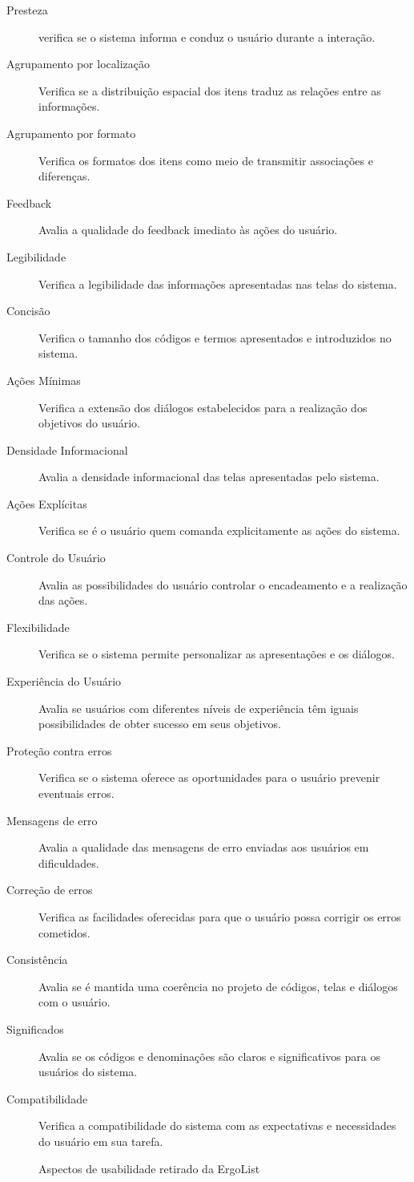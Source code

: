 \begin{description}
\item[Presteza]
verifica se o sistema informa e conduz o usuário durante a interação.
\item[Agrupamento por localização]
Verifica se a distribuição espacial dos itens traduz as relações entre as informações.
\item[Agrupamento por formato]
Verifica os formatos dos itens como meio de transmitir associações e diferenças.
\item[Feedback]
Avalia a qualidade do feedback imediato às ações do usuário.
\item[Legibilidade]
Verifica a legibilidade das informações apresentadas nas telas do sistema.
\item[Concisão]
Verifica o tamanho dos códigos e termos apresentados e introduzidos no sistema.
\item[Ações Mínimas]
Verifica a extensão dos diálogos estabelecidos para a realização dos objetivos do usuário.
\item[Densidade Informacional]
Avalia a densidade informacional das telas apresentadas pelo sistema.
\item[Ações Explícitas]
Verifica se é o usuário quem comanda explicitamente as ações do sistema.
\item[Controle do Usuário]
Avalia as possibilidades do usuário controlar o encadeamento e a realização das ações.
\item[Flexibilidade]
Verifica se o sistema permite personalizar as apresentações e os diálogos.
\item[Experiência do Usuário]
Avalia se usuários com diferentes níveis de experiência têm iguais possibilidades de obter sucesso em seus objetivos.
\item[Proteção contra erros]
Verifica se o sistema oferece as oportunidades para o usuário prevenir eventuais erros.
\item[Mensagens de erro]
Avalia a qualidade das mensagens de erro enviadas aos usuários em dificuldades.
\item[Correção de erros]
Verifica as facilidades oferecidas para que o usuário possa corrigir os erros cometidos.
\item[Consistência]
Avalia se é mantida uma coerência no projeto de códigos, telas e diálogos com o usuário.
\item[Significados]
Avalia se os códigos e denominações são claros e significativos para os usuários do sistema.
\item[Compatibilidade]
Verifica a compatibilidade do sistema com as expectativas e necessidades do usuário em sua tarefa.
\begin{flushright}
Aspectos de usabilidade retirado da ErgoList ~\cite{ergolist2013}
\end{flushright}
\end{description}

